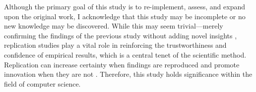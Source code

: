 \vspace{\baselineskip}
Although the primary goal of this study is to re-implement, assess, and expand upon the original work, I acknowledge that this study may be incomplete or no new knowledge may be discovered. While this may seem trivial—merely confirming the findings of the previous study without adding novel insights \cite{hendriksConsiderItParsed}, replication studies play a vital role in reinforcing the trustworthiness and confidence of empirical results, which is a central tenet of the scientific method. Replication can increase certainty when findings are reproduced and promote innovation when they are not \cite{shepperdReplicationStudiesConsidered2018}. Therefore, this study holds significance within the field of computer science.







